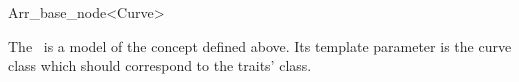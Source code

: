 
\ccRefPageBegin

\begin{ccRefClass}{Arr_base_node<Curve>}

\ccDefinition
    The \ccRefName\ is a model of the  concept
    defined above.
    Its template parameter is the curve class which should correspond to the
    traits'  class.


\ccIsModel

\end{ccRefClass}
\ccRefPageEnd
